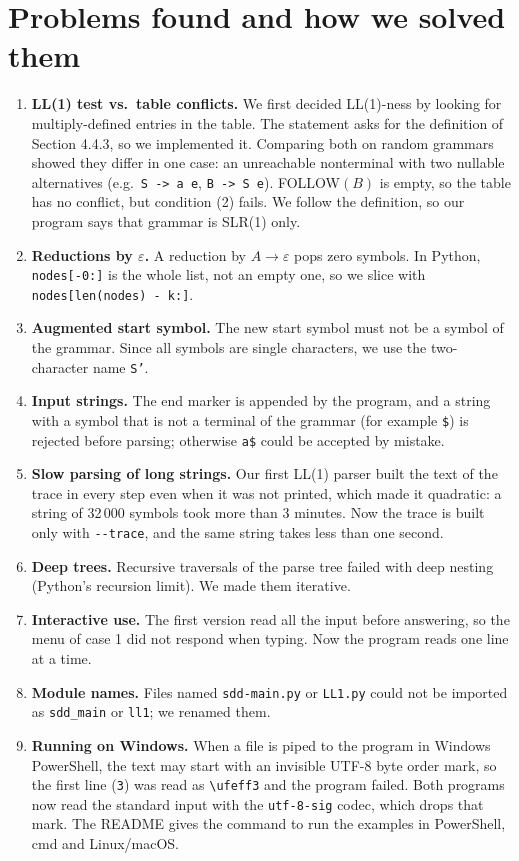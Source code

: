 \documentclass[11pt]{article}
\begin{document}
\section{Problems found and how we solved them}

\begin{enumerate}
\item \textbf{LL(1) test vs.\ table conflicts.} We first decided LL(1)-ness by
looking for multiply-defined entries in the table. The statement asks for the
definition of Section 4.4.3, so we implemented it. Comparing both on random
grammars showed they differ in one case: an unreachable nonterminal with two
nullable alternatives (e.g.\ \texttt{S -> a e}, \texttt{B -> S e}). FOLLOW$(B)$
is empty, so the table has no conflict, but condition (2) fails. We follow the
definition, so our program says that grammar is SLR(1) only.
\item \textbf{Reductions by $\varepsilon$.} A reduction by $A \to \varepsilon$
pops zero symbols. In Python, \texttt{nodes[-0:]} is the whole list, not an
empty one, so we slice with \texttt{nodes[len(nodes) - k:]}.
\item \textbf{Augmented start symbol.} The new start symbol must not be a
symbol of the grammar. Since all symbols are single characters, we use the
two-character name \texttt{S'}.
\item \textbf{Input strings.} The end marker is appended by the program, and
a string with a symbol that is not a terminal of the grammar (for example
\texttt{\$}) is rejected before parsing; otherwise \texttt{a\$} could be
accepted by mistake.
\item \textbf{Slow parsing of long strings.} Our first LL(1) parser built the
text of the trace in every step even when it was not printed, which made it
quadratic: a string of 32\,000 symbols took more than 3 minutes. Now the trace
is built only with \texttt{-{}-trace}, and the same string takes less than one
second.
\item \textbf{Deep trees.} Recursive traversals of the parse tree failed with
deep nesting (Python's recursion limit). We made them iterative.
\item \textbf{Interactive use.} The first version read all the input before
answering, so the menu of case 1 did not respond when typing. Now the program
reads one line at a time.
\item \textbf{Module names.} Files named \texttt{sdd-main.py} or \texttt{LL1.py}
could not be imported as \texttt{sdd\_main} or \texttt{ll1}; we renamed them.
\item \textbf{Running on Windows.} When a file is piped to the program in
Windows PowerShell, the text may start with an invisible UTF-8 byte order
mark, so the first line (\texttt{3}) was read as \texttt{\textbackslash ufeff3}
and the program failed. Both programs now read the standard input with the
\texttt{utf-8-sig} codec, which drops that mark. The README gives the command
to run the examples in PowerShell, cmd and Linux/macOS.
\end{enumerate}
\end{document}

